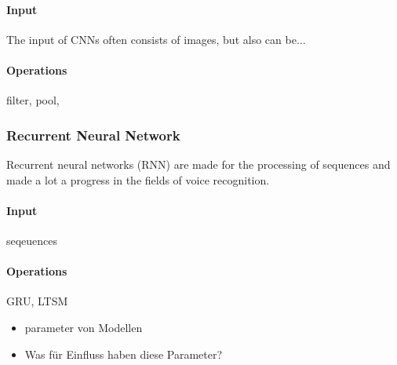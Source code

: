 \paragraph{Input}
The input of CNNs often consists of images, but also can be...

\paragraph{Operations}
filter, pool, 
\subsubsection{Recurrent Neural Network}
Recurrent neural networks (RNN) are made for the processing of sequences and made a lot a progress in the fields of voice recognition.
\paragraph{Input}
seqeuences
\paragraph{Operations}
GRU, LTSM
\begin{itemize}
    \item parameter von Modellen
    \item Was für Einfluss haben diese Parameter?
\end{itemize}


